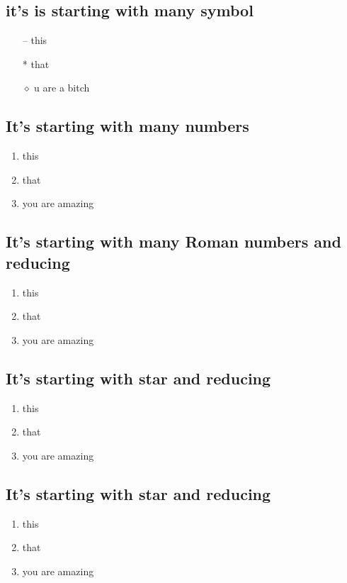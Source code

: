 \documentclass[]{article}
\begin{document}
\subsection{it's is starting with many symbol}
\begin{itemize}
\item[--]this
\item[*]that
\item[$\diamond$]u are a bitch
\end{itemize}

\subsection{It's starting with many numbers}
\begin{enumerate}
\item this
\item that
\item you are amazing
\end{enumerate}

\subsection{It's starting with many Roman numbers and reducing}
\begin{enumerate}[i]
\item this
\item that
\item you are amazing
\end{enumerate}

\subsection{It's starting with star and reducing}
\begin{enumerate}[nosep,label=*]
\item this
\item that
\item you are amazing
\end{enumerate}

\subsection{It's starting with star and reducing}
\begin{enumerate}[a]
\item this
\item that
\item you are amazing
\end{enumerate}
\end{document}
